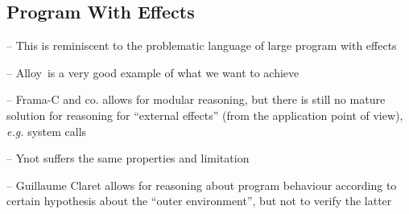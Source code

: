 \subsection{Program With Effects}

\begin{compactitem}
\item[--] This is reminiscent to the problematic language of large program with
  effects
\item[--] Alloy\,\cite{jackson2012alloy} is a very good example of what we want
  to achieve
\item[--] Frama-C and co. allows for modular reasoning, but there is still no
  mature solution for reasoning for ``external effects'' (from the application
  point of view), \emph{e.g.} system calls
\item[--] Ynot suffers the same properties and limitation
\item[--] Guillaume Claret allows for reasoning about program behaviour
  according to certain hypothesis about the ``outer environment'', but not to
  verify the latter
\end{compactitem}
